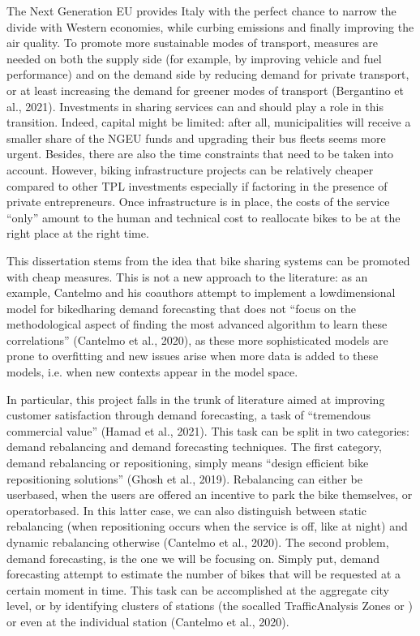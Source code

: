 \documentclass[letterpaper,10pt,english]{jupyterBook}
\begin{document}
\sphinxAtStartPar
The Next Generation EU provides Italy with the perfect chance to narrow the divide with Western economies, while curbing emissions and finally improving the air quality. To promote more sustainable modes of transport, measures are needed on both the supply side (for example, by improving vehicle and fuel performance) and on the demand side by reducing demand for private transport, or at least increasing the demand for greener modes of transport (Bergantino et al., 2021). Investments in sharing services can and should play a role in this transition. Indeed, capital might be limited: after all, municipalities will receive a smaller share of the NGEU funds and upgrading their bus fleets seems more urgent. Besides, there are also the time constraints that need to be taken into account. However, biking infrastructure projects can be relatively cheaper compared to other TPL investments \sphinxhyphen{} especially if factoring in the presence of private entrepreneurs. Once infrastructure is in place, the costs of the service “only” amount to the human and technical cost to reallocate bikes to be at the right place at the right time.

\sphinxAtStartPar
This dissertation stems from the idea that bike sharing systems can be promoted with cheap measures. This is not a new approach to the literature: as an example, Cantelmo and his coauthors attempt to implement a low\sphinxhyphen{}dimensional model for bike\sphinxhyphen{}dharing demand forecasting that does not “focus on the methodological aspect of finding the most advanced algorithm to learn these correlations” (Cantelmo et al., 2020), as these more sophisticated models are prone to overfitting and new issues arise when more data is added to these models, i.e. when new contexts appear in the model space.

\sphinxAtStartPar
In particular, this project falls in the trunk of literature aimed at improving customer satisfaction through demand forecasting, a task of “tremendous commercial value” (Hamad et al., 2021). This task can be split in two categories: demand rebalancing and demand forecasting techniques. The first category, demand rebalancing or repositioning, simply means “design efficient bike repositioning solutions” (Ghosh et al., 2019). Rebalancing can either be user\sphinxhyphen{}based, when the users are offered an incentive to park the bike themselves, or operator\sphinxhyphen{}based. In this latter case, we can also distinguish between static rebalancing (when repositioning occurs when the service is off, like at night) and dynamic rebalancing otherwise (Cantelmo et al., 2020). The second problem, demand forecasting, is the one we will be focusing on. Simply put, demand forecasting attempt to estimate the number of bikes that will be requested at a certain moment in time. This task can be accomplished at the aggregate city level, or by identifying clusters of stations (the so\sphinxhyphen{}called Traffic\sphinxhyphen{}Analysis Zones or ) or even at the individual station (Cantelmo et al., 2020).
\end{document}
